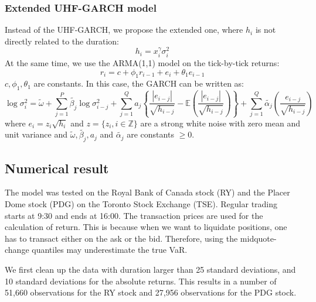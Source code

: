 \documentclass[12pt, a4paper]{article}
\begin{document}
\subsubsection{Extended UHF-GARCH model}
Instead of the UHF-GARCH, we propose the extended one, where $h_i$ is not directly related to the duration:
$$h_i = x_i^\gamma\sigma_i^2$$
At the same time, we use the ARMA(1,1) model on the tick-by-tick returns:
$$r_i = c + \phi_1 r_{i-1} + e_i + \theta_1 e_{i-1}$$
$c, \phi_1, \theta_1$ are constants. In this case, the GARCH can be written as:
$$\log \sigma^2_i = \tilde{\omega} + \sum_{j=1}^P \tilde{\beta_j} \log \sigma^2_{i-j} + \sum_{j=1}^Q a_j  \left\{ \frac{|e_{i-j}|}{\sqrt{h_{i-j}}} - \mathbb{E}\left( \frac{|e_{i-j}|}{\sqrt{h_{i-j}}} \right) \right\} + \sum_{j=1}^{Q} \tilde{\alpha_j}\left( \frac{e_{i-j}}{\sqrt{h_{i-j}}} \right)$$
where $e_i = z_i \sqrt{h_i}$ and $z = \{ z_i, i \in \mathbb{Z}\}$ are a strong white noise with zero mean and unit variance and $\tilde{\omega}, \tilde{\beta_j}, a_j$ and $\tilde{\alpha_j}$ are constants $\ge 0$.

\subsection{Numerical result}
The model was tested on the Royal Bank  of Canada stock (RY) and the Placer Dome stock (PDG) on the Toronto Stock Exchange (TSE). Regular trading starts at 9:30 and ends at 16:00. The transaction prices are used for the calculation of return. This is because when we want to liquidate positions, one has to transact either on the ask or the bid. Therefore, using the midquote-change quantiles may underestimate the true VaR.

We first clean up the data with duration larger than 25 standard deviations, and 10 standard deviations for the absolute returns. This results in a number of 51,660 observations for the RY stock and 27,956 observations for the PDG stock.
\end{document}
